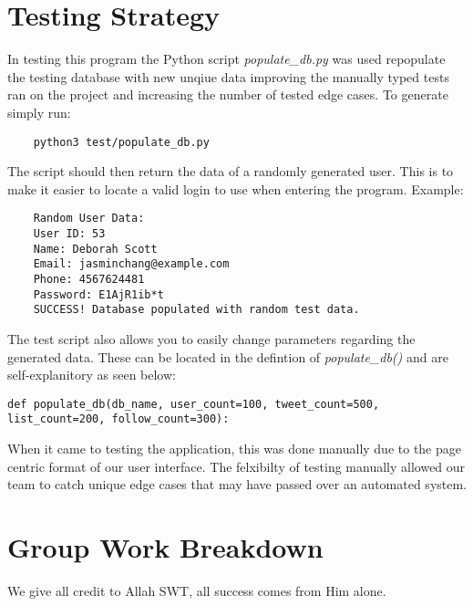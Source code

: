 \documentclass[12pt]{article}
\begin{document}
\section{Testing Strategy}
In testing this program the Python script \textit{populate\_db.py} was used repopulate the testing database with 
new unqiue data improving the manually typed tests ran on the project and increasing the number of tested edge 
cases. To generate simply run:
\begin{verbatim}
	python3 test/populate_db.py
\end{verbatim}
The script should then return the data of a randomly generated user. This is to make it easier to locate a valid
login to use when entering the program. Example: 
\begin{verbatim}
	Random User Data:
	User ID: 53
	Name: Deborah Scott
	Email: jasminchang@example.com
	Phone: 4567624481
	Password: E1AjR1ib*t
	SUCCESS! Database populated with random test data.
\end{verbatim}
The test script also allows you to easily change parameters regarding the generated data. These can be located in the
defintion of \textit{populate\_db()} and are self-explanitory as seen below:
\begin{lstlisting}
def populate_db(db_name, user_count=100, tweet_count=500, list_count=200, follow_count=300):
\end{lstlisting}
When it came to testing the application, this was done manually due to the page centric format of our user interface. 
The felxibilty of testing manually allowed our team to catch unique edge cases that may have passed over an automated
system.
\newpage


\section{Group Work Breakdown}
We give all credit to Allah SWT, all success comes from Him alone.
\end{document}

